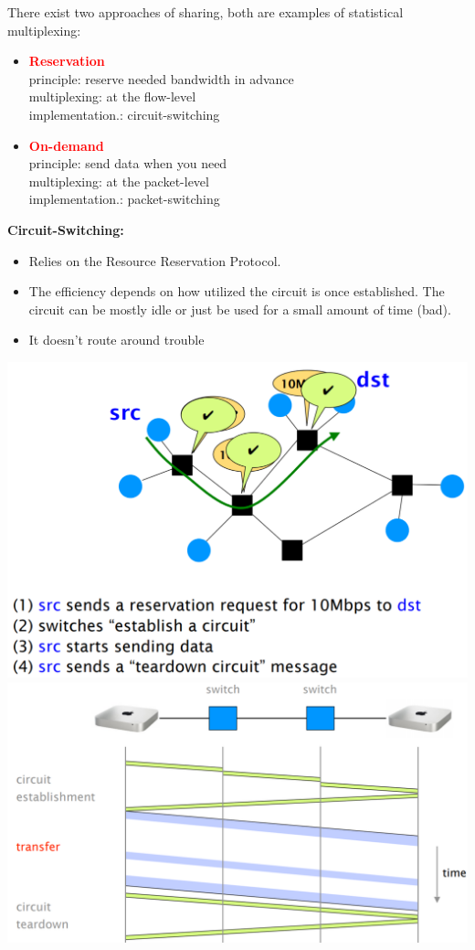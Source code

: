\documentclass[a4paper, fontsize=8pt, landscape, DIV=1]{scrartcl}
\begin{document}
\begin{multicols*}{4}
				There exist two approaches of sharing, both are examples of statistical multiplexing: 
				\begin{itemize}
					\item \textcolor{red}{\textbf{Reservation}}\\
						  principle: reserve needed bandwidth in advance\\
						  multiplexing: at the flow-level\\
						  implementation.: circuit-switching  
					\item \textcolor{red}{\textbf{On-demand}}\\
						  principle: send data when you need\\
						  multiplexing: at the packet-level\\
						  implementation.: packet-switching
				\end{itemize}
				\textbf{Circuit-Switching:}
				\vspace{-0.5cm}
				\begin{itemize}[noitemsep]
					\item Relies on the Resource Reservation Protocol.
					\item The efficiency depends on how utilized the circuit is once established. The circuit can be mostly idle or just be used for a small amount of time (bad).
					\item It doesn't route around trouble 
				\end{itemize}
				\includegraphics[width=\columnwidth]{images/Overview/circuit_switching.png}
				\includegraphics[width=\columnwidth]{images/Overview/circuit_switching_transfer.png}

\end{multicols*}
\end{document}
